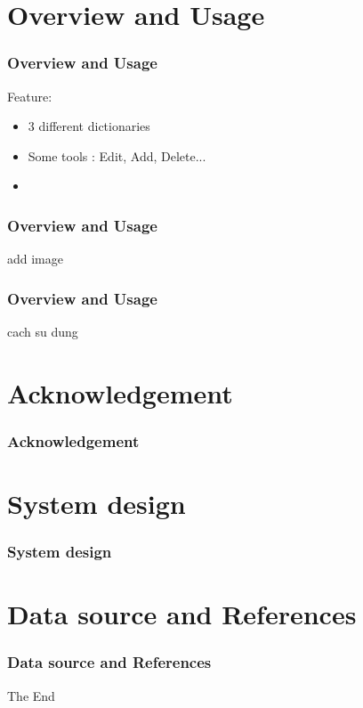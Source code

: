 \section{Overview and Usage}

\begin{frame}
\frametitle{Overview and Usage}
Feature:
\begin{itemize}
  \item 3 different dictionaries
  \item Some tools : Edit, Add, Delete...
  \item 
\end{itemize}
\end{frame}

\begin{frame}
  \frametitle{Overview and Usage}
  add image
\end{frame}

\begin{frame}
  \frametitle{Overview and Usage}
  cach su dung
\end{frame}

\section{Acknowledgement}

\begin{frame}
\frametitle{Acknowledgement}

\end{frame}

\section{System design}

\begin{frame}
\frametitle{System design}

\end{frame}

\section{Data source and References}

\begin{frame}
\frametitle{Data source and References}
\end{frame}

\begin{frame}
\Huge{\centerline{The End}}
\end{frame}